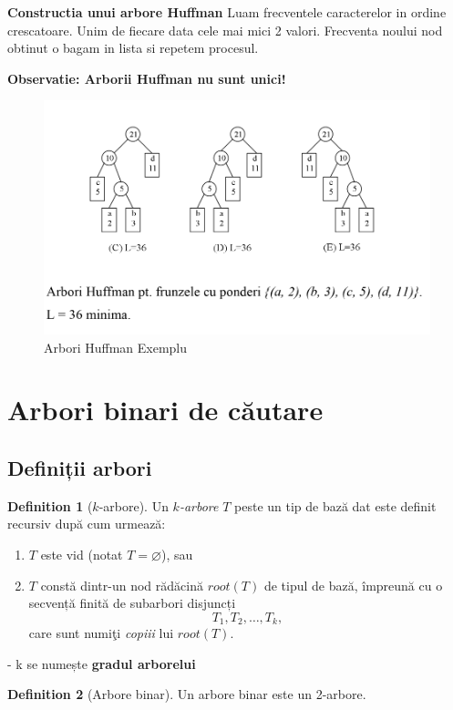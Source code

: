 \documentclass[11pt,a4paper]{article}
\theoremstyle{definition}
\newtheorem{definition}{Definition}[section]
\theoremstyle{plain}
\theoremstyle{remark}
\begin{document}
\textbf{Constructia unui arbore Huffman}
Luam frecventele caracterelor in ordine crescatoare. Unim de fiecare data cele mai mici 2 valori. Frecventa noului nod obtinut o bagam in lista si repetem procesul.

\textbf{Observatie: Arborii Huffman nu sunt unici!}

\begin{figure}[H]
    \centering
    \includegraphics[width=0.75\linewidth]{huffman.png}
    \caption{Arbori Huffman Exemplu}
    \label{fig:enter-label}
\end{figure}

\section{Arbori binari de căutare}

\subsection{Definiții arbori}

\begin{definition}[\(k\)\nobreakdash-arbore]
Un \emph{\(k\)\nobreakdash-arbore} \(T\) peste un tip de bază dat este definit recursiv după cum urmează:
\begin{enumerate}
  \item \(T\) este vid (notat \(T=\varnothing\)), sau
  \item \(T\) constă dintr-un nod rădăcină \(\mathit{root}(T)\) de tipul de bază, împreună cu o secvență finită de subarbori disjuncți
    \[
      T_1, T_2, \dots, T_k,
    \]
    care sunt numiţi \emph{copiii} lui \(\mathit{root}(T)\).
\end{enumerate}

- k se numește \textbf{gradul arborelui}
\end{definition}

\begin{definition}[Arbore binar]
  Un arbore binar este un 2-arbore.
\end{definition}
\end{document}
